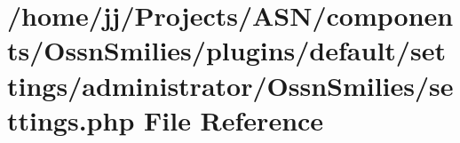 \hypertarget{components_2_ossn_smilies_2plugins_2default_2settings_2administrator_2_ossn_smilies_2settings_8php}{}\section{/home/jj/\+Projects/\+A\+S\+N/components/\+Ossn\+Smilies/plugins/default/settings/administrator/\+Ossn\+Smilies/settings.php File Reference}
\label{components_2_ossn_smilies_2plugins_2default_2settings_2administrator_2_ossn_smilies_2settings_8php}
